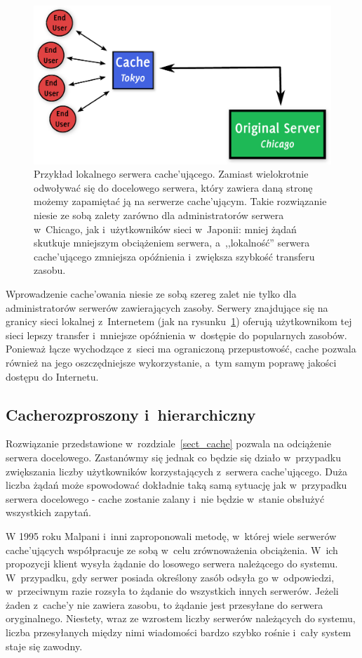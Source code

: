 \documentclass[a4paper,11pt]{scrartcl}
\newcommand{\s}{ }
\newcommand{\kesz}{cache}
\newcommand{\Kesz}{Cache}
\newcommand{\keszy}{cache'y}
\newcommand{\keszujacego}{cache'ującego}
\newcommand{\keszujacym}{cache'ującym}
\newcommand{\keszujacych}{cache'ujących}
\newcommand{\keszowania}{cache'owania}
\begin{document}
\begin{figure}[ht]
\centering
\includegraphics[width=0.85\linewidth]{img/cache.pdf}
\caption{
Przykład lokalnego serwera \keszujacego.
Zamiast wielokrotnie odwoływać się do docelowego serwera, który zawiera daną stronę
możemy zapamiętać ją na serwerze \keszujacym. Takie rozwiązanie niesie ze sobą zalety
zarówno dla administratorów serwera w~Chicago, jak i~użytkowników sieci w~Japonii:
mniej żądań skutkuje mniejszym obciążeniem serwera, a~,,lokalność'' serwera \keszujacego\s zmniejsza opóźnienia i~zwiększa szybkość transferu zasobu.
}
\label{fig_cache_server}
\end{figure}

Wprowadzenie \keszowania\s niesie ze sobą szereg zalet nie tylko dla administratorów serwerów zawierających zasoby. Serwery znajdujące się na granicy sieci lokalnej z~Internetem (jak na rysunku~\ref{fig_cache_server}) oferują użytkownikom tej sieci lepszy transfer i~mniejsze opóźnienia w~dostępie do popularnych zasobów.
Ponieważ łącze wychodzące z~sieci ma ograniczoną przepustowość, \kesz\s pozwala również na jego oszczędniejsze wykorzystanie, a~tym samym poprawę jakości dostępu do Internetu.

\subsection{\Kesz rozproszony i~hierarchiczny}\label{sect_dist_cache}
Rozwiązanie przedstawione w~rozdziale~\ref{sect_cache} pozwala na odciążenie serwera docelowego. Zastanówmy się jednak co będzie się działo w~przypadku zwiększania liczby użytkowników korzystających z~serwera \keszujacego. Duża liczba żądań może spowodować dokładnie taką samą sytuację jak w~przypadku serwera docelowego - \kesz\s zostanie zalany i~nie będzie w~stanie obsłużyć wszystkich zapytań.

W 1995 roku Malpani i~inni \cite{malpani1995making} zaproponowali metodę, w~której wiele serwerów \keszujacych\s współpracuje ze sobą w~celu zrównoważenia obciążenia. W~ich propozycji klient wysyła żądanie do losowego serwera należącego do systemu. W~przypadku, gdy serwer posiada określony zasób odsyła go w~odpowiedzi, w~przeciwnym razie rozsyła to żądanie do wszystkich innych serwerów. Jeżeli żaden z~\keszy\s nie zawiera zasobu, to żądanie jest przesyłane do serwera oryginalnego. Niestety, wraz ze wzrostem liczby serwerów należących do systemu, liczba przesyłanych między nimi wiadomości bardzo szybko rośnie i~cały system staje się zawodny.
\end{document}
